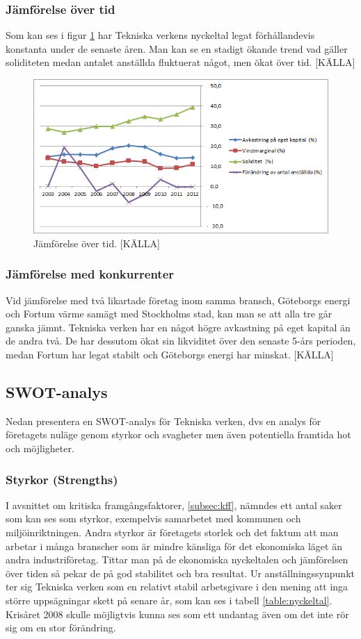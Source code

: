 \documentclass[10pt,a4paper]{article}
\begin{document}
\subsubsection{Jämförelse över tid} 
Som kan ses i figur \ref{fig:jamfor} har Tekniska verkens nyckeltal legat
förhållandevis konstanta under de senaste åren. Man kan se en stadigt ökande trend vad gäller soliditeten medan antalet anställda fluktuerat något, men ökat över tid. [KÄLLA]
\begin{figure}[H] 
\centerline{\includegraphics[scale=0.8]{Bilder/jamforelse_over_tid.png}}
\caption{Jämförelse över tid. [KÄLLA]}
\label{fig:jamfor}
\end{figure}  

\subsubsection{Jämförelse med konkurrenter}
Vid jämförelse med två likartade företag inom samma bransch, Göteborgs energi och Fortum värme samägt med Stockholms stad, kan man se att alla tre går ganska jämnt. Tekniska verken har en något högre avkastning på eget kapital än de andra två. De har dessutom ökat sin likviditet över den senaste 5-års perioden, medan Fortum har legat stabilt och Göteborgs energi har minskat. [KÄLLA]
\subsection{SWOT-analys}
Nedan presentera en SWOT-analys för Tekniska verken, dvs en analys för företagets nuläge genom styrkor och svagheter men även potentiella framtida hot och möjligheter. 

\subsubsection{Styrkor (Strengths)}
I avsnittet om kritiska framgångsfaktorer, \ref{subsec:kff}, nämndes ett antal
saker som kan ses som styrkor, exempelvis samarbetet med kommunen och
miljöinriktningen. Andra styrkor är företagets storlek och det
faktum att man arbetar i många branscher som är mindre känsliga för det
ekonomiska läget än andra industriföretag. Tittar man på de ekonomiska
nyckeltalen och jämförelsen över tiden så pekar de på god stabilitet och bra
resultat. Ur anställningssynpunkt ter sig Tekniska verken som en relativt 
stabil arbetsgivare i den mening att inga större uppsägningar skett på senare
år, som kan ses i tabell \ref{table:nyckeltal}. Krisåret 2008 skulle möjligtvis
kunna ses som ett undantag även om det inte rör sig om en stor förändring.
\end{document}
